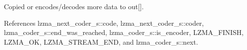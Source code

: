 Copied or encodes/decodes more data to out[]. 



References lzma\-\_\-next\-\_\-coder\-\_\-s\-::code, lzma\-\_\-next\-\_\-coder\-\_\-s\-::coder, lzma\-\_\-coder\-\_\-s\-::end\-\_\-was\-\_\-reached, lzma\-\_\-coder\-\_\-s\-::is\-\_\-encoder, L\-Z\-M\-A\-\_\-\-F\-I\-N\-I\-S\-H, L\-Z\-M\-A\-\_\-\-O\-K, L\-Z\-M\-A\-\_\-\-S\-T\-R\-E\-A\-M\-\_\-\-E\-N\-D, and lzma\-\_\-coder\-\_\-s\-::next.

